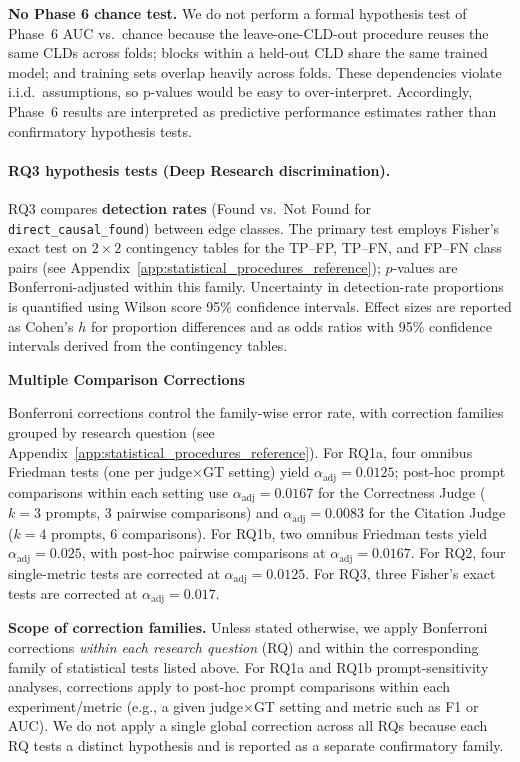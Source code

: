 \textbf{No Phase 6 chance test.} We do not perform a formal hypothesis test of Phase~6 AUC vs.\ chance because the leave-one-CLD-out procedure reuses the same CLDs across folds; blocks within a held-out CLD share the same trained model; and training sets overlap heavily across folds. These dependencies violate i.i.d.\ assumptions, so p-values would be easy to over-interpret. Accordingly, Phase~6 results are interpreted as predictive performance estimates rather than confirmatory hypothesis tests.

\paragraph{RQ3 hypothesis tests (Deep Research discrimination).}
RQ3 compares \textbf{detection rates} (Found vs.\ Not Found for \texttt{direct\_causal\_found}) between edge classes. The primary test employs Fisher's exact test on $2\times2$ contingency tables for the TP--FP, TP--FN, and FP--FN class pairs (see Appendix~\ref{app:statistical_procedures_reference}); $p$-values are Bonferroni-adjusted within this family. Uncertainty in detection-rate proportions is quantified using Wilson score 95\% confidence intervals. Effect sizes are reported as Cohen's $h$ for proportion differences and as odds ratios with 95\% confidence intervals derived from the contingency tables.

\noindent\textbf{Multiple Comparison Corrections}
\label{sec:multiple_comparisons}

Bonferroni corrections control the family-wise error rate, with correction families grouped by research question (see Appendix~\ref{app:statistical_procedures_reference}). For RQ1a, four omnibus Friedman tests (one per judge$\times$GT setting) yield $\alpha_{\text{adj}} = 0.0125$; post-hoc prompt comparisons within each setting use $\alpha_{\text{adj}} = 0.0167$ for the Correctness Judge ($k=3$ prompts, 3 pairwise comparisons) and $\alpha_{\text{adj}} = 0.0083$ for the Citation Judge ($k=4$ prompts, 6 comparisons). For RQ1b, two omnibus Friedman tests yield $\alpha_{\text{adj}} = 0.025$, with post-hoc pairwise comparisons at $\alpha_{\text{adj}} = 0.0167$. For RQ2, four single-metric tests are corrected at $\alpha_{\text{adj}} = 0.0125$. For RQ3, three Fisher's exact tests are corrected at $\alpha_{\text{adj}} = 0.017$.

\textbf{Scope of correction families.} Unless stated otherwise, we apply Bonferroni corrections \emph{within each research question} (RQ) and within the corresponding family of statistical tests listed above. For RQ1a and RQ1b prompt-sensitivity analyses, corrections apply to post-hoc prompt comparisons within each experiment/metric (e.g., a given judge$\times$GT setting and metric such as F1 or AUC). We do not apply a single global correction across all RQs because each RQ tests a distinct hypothesis and is reported as a separate confirmatory family.

